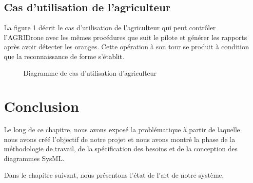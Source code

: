 			\subsection{Cas d'utilisation de l'agriculteur }
			La figure \ref{fig:D.A} décrit le cas d'utilisation de l'agriculteur qui peut contrôler l'AGRIDrone avec les mêmes procédures que suit le pilote et générer les rapports après avoir détecter les oranges. Cette opération à son tour se produit à condition que la reconnaissance de forme s'établit. 
			\begin{figure}[H] 
				\begin{center} 
					\centering
			\hspace*{-0.7cm}	
						\end{center}
				
				\caption{\label{fig:D.A}Diagramme de cas d'utilisation d'agriculteur}	
				
				\end {figure}
				
			   \section*{Conclusion}
				Le long de ce chapitre, nous avons exposé la problématique à partir de laquelle nous avons créé l'objectif de notre projet et nous avons montré la phase de la méthodologie de travail, de la spécification des besoins et de la conception des diagrammes SysML.
				
				Dans le chapitre suivant, nous présentons l'état de l'art de notre système.


	

